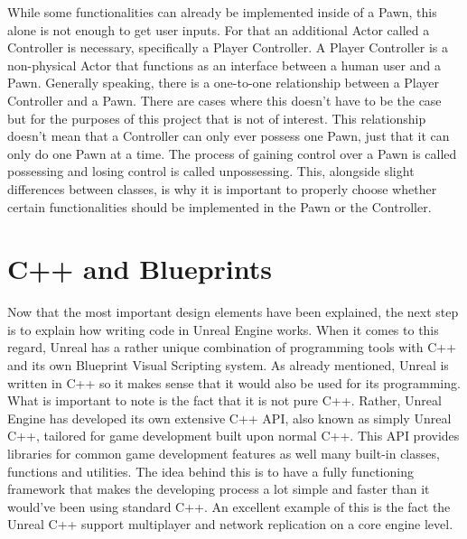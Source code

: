While some functionalities can already be implemented inside of a Pawn, this alone is not enough to get user inputs. For that an additional Actor called a Controller is necessary, specifically a Player Controller. A Player Controller is a non-physical Actor that functions as an interface between a human user and a Pawn\cite{bib:UEControllers}. Generally speaking, there is a one-to-one relationship between a Player Controller and a Pawn. There are cases where this doesn't have to be the case but for the purposes of this project that is not of interest. This relationship doesn't mean that a Controller can only ever possess one Pawn, just that it can only do one Pawn at a time. The process of gaining control over a Pawn is called possessing and losing control is called unpossessing. This, alongside slight differences between classes, is why it is important to properly choose whether certain functionalities should be implemented in the Pawn or the Controller.

\section{C++ and Blueprints}

Now that the most important design elements have been explained, the next step is to explain how writing code in Unreal Engine works. When it comes to this regard, Unreal has a rather unique combination of programming tools with C++ and its own Blueprint Visual Scripting system. As already mentioned, Unreal is written in C++ so it makes sense that it would also be used for its programming. What is important to note is the fact that it is not pure C++. Rather, Unreal Engine has developed its own extensive C++ \acs{API}, also known as simply Unreal C++, tailored for game development built upon normal C++\cite{bib:UECPlus}. This \acs{API} provides libraries for common game development features as well many built-in classes, functions and utilities. The idea behind this is to have a fully functioning framework that makes the developing process a lot simple and faster than it would've been using standard C++. An excellent example of this is the fact the Unreal C++ support multiplayer and network replication on a core engine level.\\

